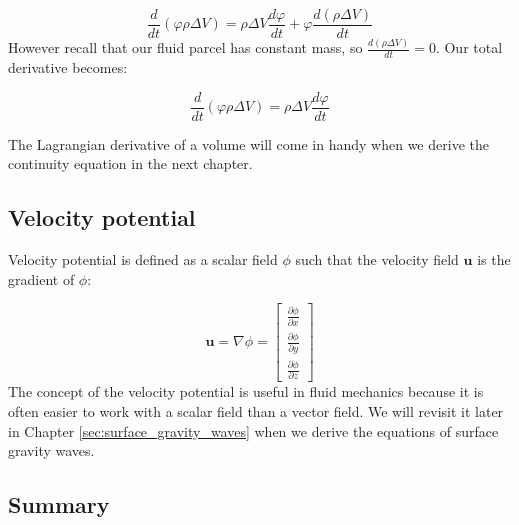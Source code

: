 \documentclass[12pt]{article}
\numberwithin{equation}{section}
\numberwithin{figure}{section}
\numberwithin{table}{section}
\begin{document}
\begin{equation}
  \frac{d}{dt} (\varphi \rho \Delta V) = \rho \Delta V \frac{d\varphi}{dt} + \varphi \frac{d(\rho \Delta V)}{dt}
\end{equation}
However recall that our fluid parcel has constant mass, so $\frac{d(\rho \Delta V)}{dt} = 0$.
Our total derivative becomes:

\begin{equation}
  \frac{d}{dt} (\varphi \rho \Delta V) = \rho \Delta V \frac{d\varphi}{dt}
\end{equation}

The Lagrangian derivative of a volume will come in handy when we derive the
continuity equation in the next chapter.

\subsection{Velocity potential}

Velocity potential is defined as a scalar field $\phi$ such that the velocity
field $\mathbf{u}$ is the gradient of $\phi$:

\begin{equation}
  \mathbf{u} = \nabla \phi =
  \begin{bmatrix}
    \frac{\partial \phi}{\partial x} \\
    \frac{\partial \phi}{\partial y} \\
    \frac{\partial \phi}{\partial z}
  \end{bmatrix}
\end{equation}
The concept of the velocity potential is useful in fluid mechanics because it is
often easier to work with a scalar field than a vector field.
We will revisit it later in Chapter \ref{sec:surface_gravity_waves} when we
derive the equations of surface gravity waves.




\subsection*{Summary}
\end{document}

